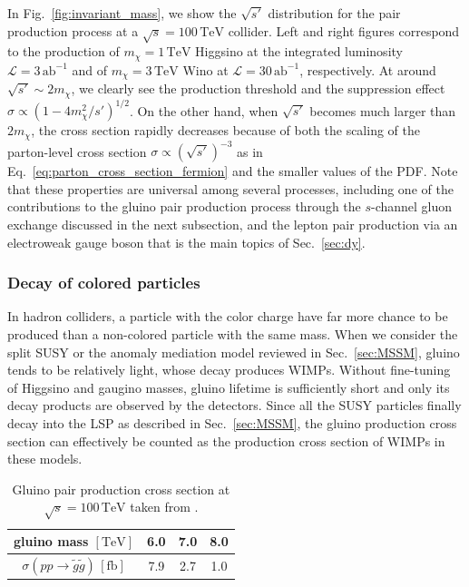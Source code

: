 \documentclass[12pt,twoside,book]{article}
\begin{document}
In Fig.~\ref{fig:invariant_mass}, we show the $\sqrt{s'}$ distribution for the pair production process at a $\sqrt{s} = 100\,\mathrm{TeV}$ collider.
Left and right figures correspond to the production of $m_\chi = 1\,\mathrm{TeV}$ Higgsino at the integrated luminosity $\mathcal{L} = 3\,\mathrm{ab}^{-1}$ and of $m_\chi = 3\,\mathrm{TeV}$ Wino at $\mathcal{L} = 30\,\mathrm{ab}^{-1}$, respectively.
At around $\sqrt{s'} \sim 2 m_\chi$, we clearly see the production threshold and the suppression effect $\sigma \propto (1-4 m_\chi^2 / s')^{1/2}$.
On the other hand, when $\sqrt{s'}$ becomes much larger than $2m_\chi$, the cross section rapidly decreases because of both the scaling of the parton-level cross section $\sigma \propto (\sqrt{s'})^{-3}$ as in Eq.~\eqref{eq:parton_cross_section_fermion} and the smaller values of the PDF.
Note that these properties are universal among several processes, including one of the contributions to the gluino pair production process through the $s$-channel gluon exchange discussed in the next subsection, and the lepton pair production via an electroweak gauge boson that is the main topics of Sec.~\ref{sec:dy}.



\subsubsection*{Decay of colored particles}

In hadron colliders, a particle with the color charge have far more chance to be produced than a non-colored particle with the same mass.
When we consider the split SUSY or the anomaly mediation model reviewed in Sec.~\ref{sec:MSSM}, gluino tends to be relatively light, whose decay produces WIMPs.
Without fine-tuning of Higgsino and gaugino masses, gluino lifetime is sufficiently short and only its decay products are observed by the detectors.
Since all the SUSY particles finally decay into the LSP as described in Sec.~\ref{sec:MSSM}, the gluino production cross section can effectively be counted as the production cross section of WIMPs in these models.

\begin{table}[t]
  \centering
  \begin{tabular}{c|ccc}
    gluino mass $\mathrm{[TeV]}$ & 6.0 & 7.0 & 8.0 \\ \hline
    $\sigma(p p \to \tilde{g} \tilde{g})\, \mathrm{[fb]}$ & 7.9 & 2.7 & 1.0
  \end{tabular}
  \caption{Gluino pair production cross section at $\sqrt{s} = 100\,\mathrm{TeV}$ taken from \cite{Asai:2019wst}.}
  \label{tab:gluino_pair}
\end{table}
\end{document}
